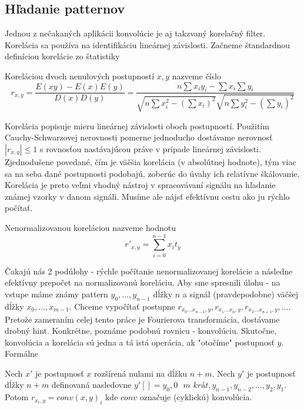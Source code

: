 \subsection{Hľadanie patternov}
Jednou z nečakaných aplikácii konvolúcie je aj takzvaný korelačný
filter. Korelácia sa používa na identifikáciu lineárnej závislosti.
Začneme štandardnou definíciou korelácie zo štatistiky
\begin{definicia}[Korelácia]
  Koreláciou dvoch nenulových postupností $x,y$ nazveme číslo
  \begin{equation*}
    r_{x,y} = \frac{E(xy)-E(x)E(y)}{D(x)D(y)} =
        \frac{n \sum x_i y_i - \sum x_i \sum y_i}{
        \sqrt{n \sum x_i^2 - (\sum x_i)^2}
        \sqrt{n \sum y_i^2 - (\sum y_i)^2}}
  \end{equation*}
\end{definicia}
Korelácia popisuje mieru lineárnej závislosti oboch postupností.
Použitím Cauchy-Schwarzovej nerovnosti pomerne jednoducho dostávame
nerovnosť $|r_{x,y}| \le 1$ s rovnosťou nastávajúcou práve v prípade
lineárnej závislosti. Zjednodušene povedané, čím je väčšia korelácia
(v absolútnej hodnote), tým viac sa na seba dané postupnosti podobajú,
zoberúc do úvahy ich relatívne škálovanie. Korelácia je preto veľmi
vhodný nástroj v spracovávaní signálu na hľadanie známej vzorky v
danom signáli. Musíme ale nájsť efektívnu cestu ako ju rýchlo počítať.
\begin{definicia}
    Nenormalizovanou koreláciou nazveme hodnotu
    \begin{equation*}
        r'_{x,y} = \sum_{i=0}^{n-1} x_i t_y
    \end{equation*}
\end{definicia}
Čakajú nás 2 podúlohy - rýchle počítanie nenormalizovanej korelácie a
následne efektívny prepočet na normalizovanú koreláciu.
Aby sme spresnili úlohu - na vstupe máme známy pattern $y_0,\dots,y_{n-1}$
dĺžky $n$ a signál (pravdepodobne) väčšej dĺžky $x_0,\dots, x_{m-1}$.
Chceme vypočítať postupne
$r_{x_0\dots x_{n-1},y}, r_{x_1\dots x_n,y}, r_{x_2\dots x_{n+1},y},\dots$.
Pretože zameraním celej tento práce je Fourierova transformácia,
dostávame drobný hint. Konkrétne, poznáme podobnú rovnicu - konvolúciu.
Skutočne, konvolúcia a korelácia sú jedna a tá istá operácia, ak
"otočíme" postupnosť $y$.
Formálne
\begin{lema}
    Nech $x'$ je postupnosť $x$ rozšírená nulami na dĺžku $n+m$.
    Nech $y'$ je postupnosť dĺžky $n+m$ definovaná nasledovne
        $y'[]=y_0, 0 \textit{ $m$ krát}, y_{n-1}, y_{n-2}, \dots, y_2, y_1$.
    Potom $r_{x_i,y} = conv(x,y)_i$ kde $conv$ označuje (cyklickú)
    konvolúcia.
\end{lema}
